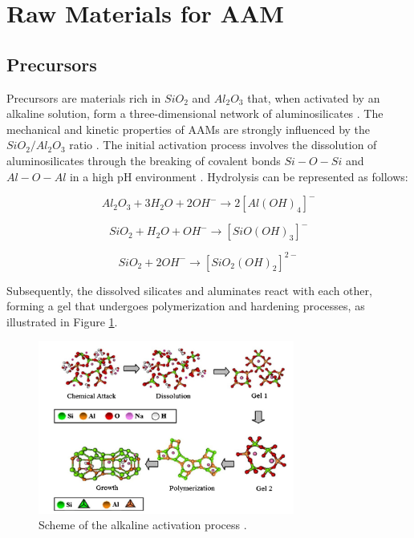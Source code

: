 \section{Raw Materials for AAM}

\subsection{Precursors}

Precursors are materials rich in $SiO_2$ and $Al_2O_3$ that, when activated by an alkaline solution, form a three-dimensional network of aluminosilicates \cite{rakhimova2019metakaolin}.
The mechanical and kinetic properties of AAMs are strongly influenced by the $SiO_2/Al_2O_3$ ratio \cite{provis2007geopolymerisation}.
The initial activation process involves the dissolution of aluminosilicates through the breaking of covalent bonds $Si-O-Si$ and $Al-O-Al$ in a high pH environment \cite{Severo2013}. Hydrolysis can be represented as follows:

\begin{equation}
  Al_2O_3 + 3H_2O + 2OH^- \rightarrow 2\left[Al(OH)_4\right]^- 
\end{equation}

\begin{equation}
  SiO_2 + H_2O + OH^- \rightarrow \left[SiO(OH)_3\right]^- 
\end{equation}

\begin{equation}
  SiO_2 + 2OH^- \rightarrow \left[SiO_2(OH)_2\right]^{2-}
\end{equation}

Subsequently, the dissolved silicates and aluminates react with each other, forming a gel that undergoes polymerization and hardening processes, as illustrated in Figure \ref{fig:activation}.

\begin{figure}[ht]
  \centering
  \includegraphics[width=0.75\textwidth]{Cap2/activation.png}
  \caption{Scheme of the alkaline activation process \cite{duxson2006geopolymer}.}
  \label{fig:activation}
\end{figure}

